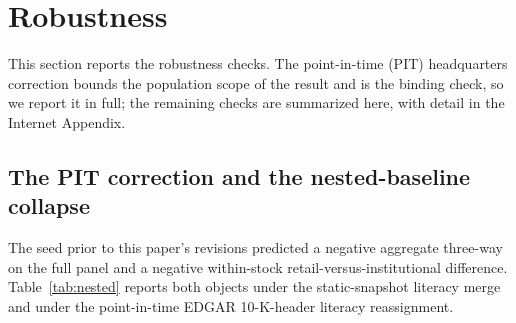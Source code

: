 \section{Robustness}
\label{sec:robustness}

This section reports the robustness checks. The point-in-time (PIT) headquarters correction bounds the population scope of the result and is the binding check, so we report it in full; the remaining checks are summarized here, with detail in the Internet Appendix.

\subsection{The PIT correction and the nested-baseline collapse}
\label{sec:robust_pit}
\label{sec:nestedbaseline}

The seed prior to this paper's revisions predicted a negative aggregate three-way on the full panel and a negative within-stock retail-versus-institutional difference. Table~\ref{tab:nested} reports both objects under the static-snapshot literacy merge and under the point-in-time EDGAR 10-K-header literacy reassignment.

